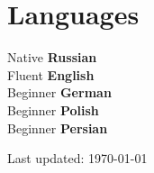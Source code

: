 \documentclass[11pt]{article} %
\begin{document}
\section*{Languages}

Native \textbf{Russian}\\
Fluent \textbf{English}\\
Beginner \textbf{German}\\
Beginner \textbf{Polish}\\
Beginner \textbf{Persian}



\begin{center}
	\scriptsize
	Last updated: \today
\end{center}

\end{document}
